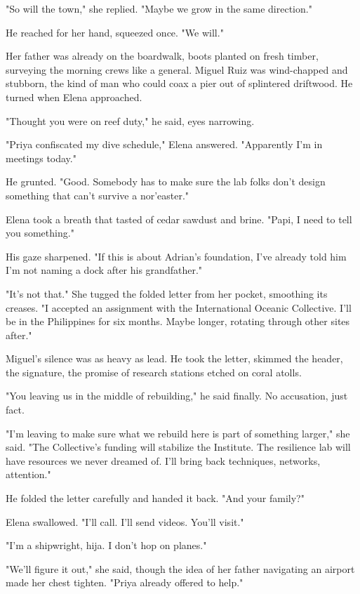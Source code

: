 "So will the town," she replied. "Maybe we grow in the same direction."

He reached for her hand, squeezed once. "We will."

\bigskip

Her father was already on the boardwalk, boots planted on fresh timber, surveying the morning crews like a general. Miguel Ruiz was wind-chapped and stubborn, the kind of man who could coax a pier out of splintered driftwood. He turned when Elena approached.

"Thought you were on reef duty," he said, eyes narrowing.

"Priya confiscated my dive schedule," Elena answered. "Apparently I'm in meetings today."

He grunted. "Good. Somebody has to make sure the lab folks don't design something that can't survive a nor'easter."

Elena took a breath that tasted of cedar sawdust and brine. "Papi, I need to tell you something."

His gaze sharpened. "If this is about Adrian's foundation, I've already told him I'm not naming a dock after his grandfather."

"It's not that." She tugged the folded letter from her pocket, smoothing its creases. "I accepted an assignment with the International Oceanic Collective. I'll be in the Philippines for six months. Maybe longer, rotating through other sites after."

Miguel's silence was as heavy as lead. He took the letter, skimmed the header, the signature, the promise of research stations etched on coral atolls.

"You leaving us in the middle of rebuilding," he said finally. No accusation, just fact.

"I'm leaving to make sure what we rebuild here is part of something larger," she said. "The Collective's funding will stabilize the Institute. The resilience lab will have resources we never dreamed of. I'll bring back techniques, networks, attention."

He folded the letter carefully and handed it back. "And your family?"

Elena swallowed. "I'll call. I'll send videos. You'll visit."

"I'm a shipwright, hija. I don't hop on planes."

"We'll figure it out," she said, though the idea of her father navigating an airport made her chest tighten. "Priya already offered to help."

